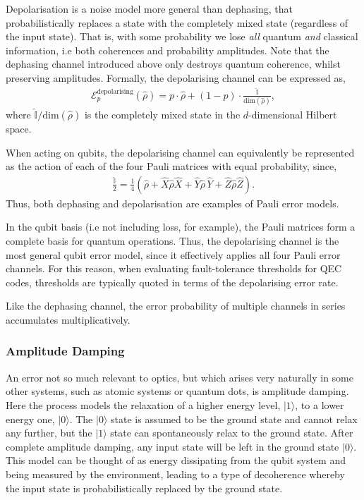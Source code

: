 \documentclass[aps,rmp,twocolumn,amsmath,amssymb,nofootinbib,superscriptaddress]{revtex4}
\newcommand{\ket}[1]{|#1\rangle}
\begin{document}
Depolarisation is a noise model more general than dephasing, that probabilistically replaces a state with the completely mixed state (regardless of the input state). That is, with some probability we lose \emph{all} quantum \emph{and} classical information, i.e both coherences and probability amplitudes. Note that the dephasing channel introduced above only destroys quantum coherence, whilst preserving amplitudes. Formally, the depolarising channel can be expressed as,
\begin{align} \label{eq:depolarizing_channel}
\mathcal{E}^\mathrm{depolarising}_p(\hat\rho) = p \cdot \hat\rho + (1-p)\cdot \frac{\mathbb{\hat{I}}}{\mathrm{dim}(\hat\rho)},
\end{align}
where $\mathbb{\hat{I}}/\mathrm{dim}(\hat\rho)$ is the completely mixed state in the $d$-dimensional Hilbert space.

When acting on qubits, the depolarising channel can equivalently be represented as the action of each of the four Pauli matrices with equal probability, since,
\begin{align}
\frac{\mathbb{\hat{I}}}{2} = \frac{1}{4}(\hat\rho + \hat{X}\hat\rho\hat{X} + \hat{Y}\hat\rho\,\hat{Y} + \hat{Z}\hat\rho\hat{Z}).
\end{align}
Thus, both dephasing and depolarisation are examples of Pauli error models.

In the qubit basis (i.e not including loss, for example), the Pauli matrices form a complete basis for quantum operations. Thus, the depolarising channel is the most general qubit error model, since it effectively applies all four Pauli error channels. For this reason, when evaluating fault-tolerance thresholds for QEC codes, thresholds are typically quoted in terms of the depolarising error rate.

Like the dephasing channel, the error probability of multiple channels in series accumulates multiplicatively.

%
%

\subsubsection{Amplitude Damping}

An error not so much relevant to optics, but which arises very naturally in some other systems, such as atomic systems or quantum dots, is amplitude damping. Here the process models the relaxation of a higher energy level, $\ket{1}$, to a lower energy one, $\ket{0}$. The $\ket{0}$ state is assumed to be the ground state and cannot relax any further, but the $\ket{1}$ state can spontaneously relax to the ground state. After complete amplitude damping, any input state will be left in the ground state $\ket{0}$. This model can be thought of as energy dissipating from the qubit system and being measured by the environment, leading to a type of decoherence whereby the input state is probabilistically replaced by the ground state.
\end{document}
